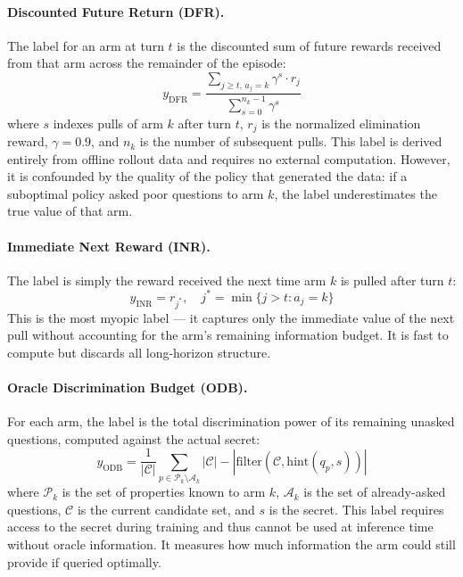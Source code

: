 \documentclass[11pt]{article}
\theoremstyle{plain}
\theoremstyle{definition}
\theoremstyle{remark}
\begin{document}
\paragraph{Discounted Future Return (DFR).}
The label for an arm at turn $t$ is the discounted sum of future rewards 
received from that arm across the remainder of the episode:
\begin{equation}
    y_{\text{DFR}} = \frac{\sum_{j \geq t,\, a_j = k} \gamma^{s} \cdot r_j}
    {\sum_{s=0}^{n_k - 1} \gamma^s}
\end{equation}
where $s$ indexes pulls of arm $k$ after turn $t$, $r_j$ is the normalized 
elimination reward, $\gamma = 0.9$, and $n_k$ is the number of subsequent 
pulls. This label is derived entirely from offline rollout data and requires 
no external computation. However, it is confounded by the quality of the 
policy that generated the data: if a suboptimal policy asked poor questions 
to arm $k$, the label underestimates the true value of that arm.

\paragraph{Immediate Next Reward (INR).}
The label is simply the reward received the next time arm $k$ is pulled 
after turn $t$:
\begin{equation}
    y_{\text{INR}} = r_{j^*}, \quad j^* = \min\{j > t : a_j = k\}
\end{equation}
This is the most myopic label — it captures only the immediate value of 
the next pull without accounting for the arm's remaining information budget. 
It is fast to compute but discards all long-horizon structure.

\paragraph{Oracle Discrimination Budget (ODB).}
For each arm, the label is the total discrimination power of its remaining 
unasked questions, computed against the actual secret:
\begin{equation}
    y_{\text{ODB}} = \frac{1}{|\mathcal{C}|} \sum_{p \in \mathcal{P}_k \setminus \mathcal{A}_k} 
    \left| \mathcal{C} \right| - \left| \text{filter}(\mathcal{C}, \text{hint}(q_p, s)) \right|
\end{equation}
where $\mathcal{P}_k$ is the set of properties known to arm $k$, 
$\mathcal{A}_k$ is the set of already-asked questions, $\mathcal{C}$ is 
the current candidate set, and $s$ is the secret. This label requires 
access to the secret during training and thus cannot be used at inference 
time without oracle information. It measures how much information the arm 
could still provide if queried optimally.
\end{document}
